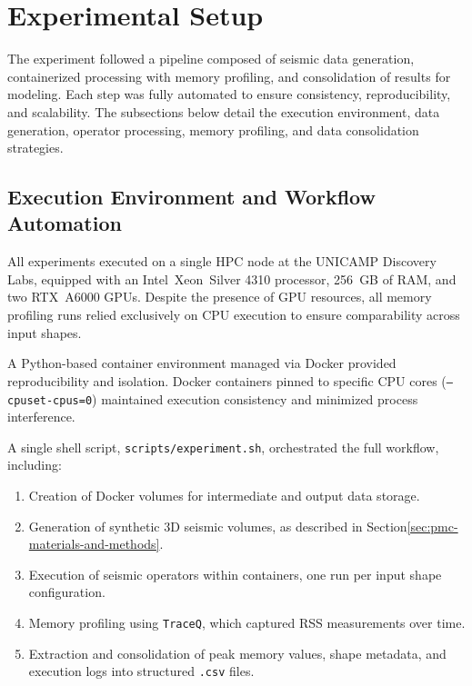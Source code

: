 \section{Experimental Setup}
\label{sec:pmc-experimental-setup}

The experiment followed a pipeline composed of seismic data generation, containerized processing with memory profiling, and consolidation of results for modeling.
Each step was fully automated to ensure consistency, reproducibility, and scalability.
The subsections below detail the execution environment, data generation, operator processing, memory profiling, and data consolidation strategies.

\subsection{Execution Environment and Workflow Automation}
\label{subsec:pmc-execution-environment-and-workflow-automation}

All experiments executed on a single \ac{HPC} node at the \ac{UNICAMP} Discovery Labs, equipped with an Intel\textregistered\ Xeon\textregistered\ Silver 4310 processor, 256~\ac{GB} of \ac{RAM}, and two \ac{RTX}~A6000 \ac{GPU}s. Despite the presence of \ac{GPU} resources, all memory profiling runs relied exclusively on \ac{CPU} execution to ensure comparability across input shapes.

A Python-based container environment managed via Docker provided reproducibility and isolation.
Docker containers pinned to specific \ac{CPU} cores (\texttt{–cpuset-cpus=0}) maintained execution consistency and minimized process interference.

A single shell script, \texttt{scripts/experiment.sh}\cite{delucca2025experiment2script}, orchestrated the full workflow, including:
\begin{enumerate}
    \item Creation of Docker volumes for intermediate and output data storage.
    \item Generation of synthetic \ac{3D} seismic volumes, as described in Section\ref{sec:pmc-materials-and-methods}.
    \item Execution of seismic operators within containers, one run per input shape configuration.
    \item Memory profiling using \texttt{TraceQ}, which captured \ac{RSS} measurements over time.
    \item Extraction and consolidation of peak memory values, shape metadata, and execution logs into structured \texttt{.csv} files.
\end{enumerate}

